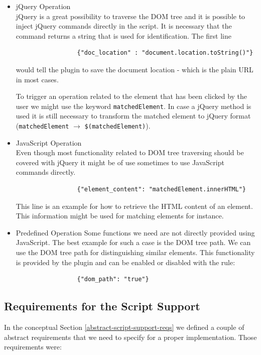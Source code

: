 \begin{itemize}
	\item jQuery Operation \\ 
	jQuery is a great possibility to traverse the DOM tree and it is possible to inject jQuery commands directly in the script. It is necessary that the command returns a string that is used for identification. The first line
		\begin{lstlisting}
		         {"doc_location" : "document.location.toString()"}
		\end{lstlisting}
	would tell the plugin to save the document location - which is the plain URL in most cases. 
	
	To trigger an operation related to the element that has been clicked by the user we might use the keyword \verb^matchedElement^. In case a jQuery method is used it is still necessary to transform the matched element to jQuery format (\verb^matchedElement^ $\rightarrow$ \verb^$(matchedElement)^). 
	
	\item	 JavaScript Operation \\
	Even though most functionality related to DOM tree traversing should be covered with jQuery it might be of use sometimes to use JavaScript commands directly. 
		\begin{lstlisting}
		         {"element_content": "matchedElement.innerHTML"}
		\end{lstlisting}
	This line is an example for how to retrieve the HTML content of an element. This information might be used for matching elements for instance. 
	
	\item Predefined Operation \label{predefined-operation}
	Some functions we need are not directly provided using JavaScript. The best example for such a case is the DOM tree path. We can use the DOM tree path for distinguishing similar elements. This functionality is provided by the plugin and can be enabled or disabled with the rule:
		\begin{lstlisting}
		         {"dom_path": "true"}
		\end{lstlisting}	
\end{itemize}

\subsection{Requirements for the Script Support}

In the conceptual Section \ref{abstract-script-support-reqs} we defined a couple of abstract requirements that we need to specify for a proper implementation. Those requirements were:

